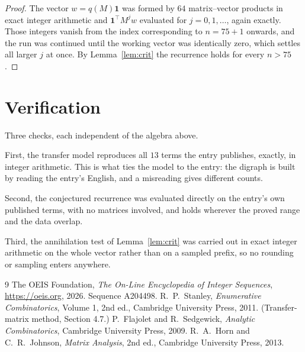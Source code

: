 \documentclass[11pt,a4paper]{article}
\theoremstyle{plain}
\theoremstyle{definition}
\begin{document}
\begin{proof}
The vector $w=q(M)\mathbf{1}$ was formed by $64$ matrix--vector products in exact
integer arithmetic and $\mathbf{1}^{\!\top}M^{j}w$ evaluated for $j=0,1,\dots$, again
exactly. Those integers vanish from the index corresponding to $n=75+1$ onwards, and the
run was continued until the working vector was identically zero, which settles all larger $j$
at once. By Lemma~\ref{lem:crit} the recurrence holds for every $n>75$.
\end{proof}

\section{Verification}

Three checks, each independent of the algebra above.

First, the transfer model reproduces all $13$ terms the entry publishes, exactly, in
integer arithmetic. This is what ties the model to the entry: the digraph is built by reading
the entry's English, and a misreading gives different counts.

Second, the conjectured recurrence was evaluated directly on the entry's own published terms,
with no matrices involved, and holds wherever the proved range and the data overlap.

Third, the annihilation test of Lemma~\ref{lem:crit} was carried out in exact integer
arithmetic on the whole vector rather than on a sampled prefix, so no rounding or sampling
enters anywhere.

\begin{thebibliography}{9}
 The OEIS Foundation, \emph{The On-Line Encyclopedia of Integer
Sequences}, \url{https://oeis.org}, 2026. Sequence A204498.
 R.~P.~Stanley, \emph{Enumerative Combinatorics}, Volume 1, 2nd ed.,
Cambridge University Press, 2011. (Transfer-matrix method, Section 4.7.)
 P.~Flajolet and R.~Sedgewick, \emph{Analytic Combinatorics}, Cambridge
University Press, 2009.
 R.~A.~Horn and C.~R.~Johnson, \emph{Matrix Analysis}, 2nd ed., Cambridge
University Press, 2013.
\end{thebibliography}
\end{document}
